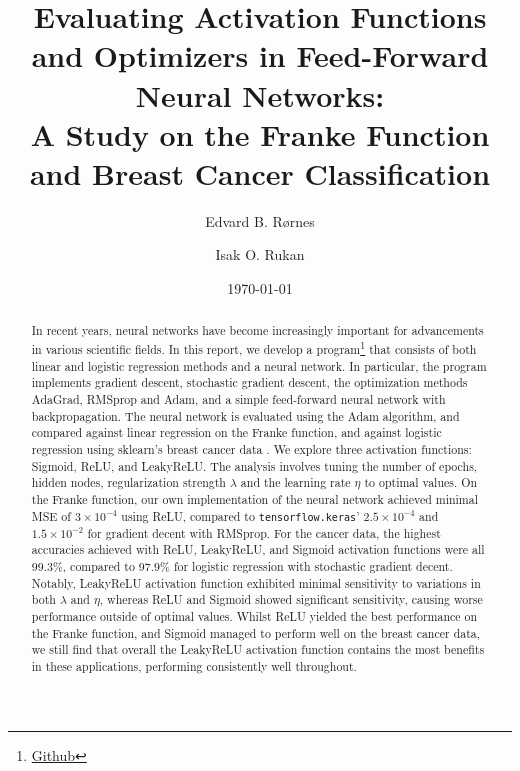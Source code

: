 \documentclass[%
reprint,s
amsmath,amssymb,
aps,
]{revtex4-2}
\begin{document}
	
\title{Evaluating Activation Functions and Optimizers in Feed-Forward Neural Networks: \\A Study on the Franke Function and Breast Cancer Classification}
\author{Edvard B. Rørnes}
\author{Isak O. Rukan}
\date{\today}

\begin{abstract}
	In recent years, neural networks have become increasingly important for advancements in various scientific fields. In this report, we develop a program\footnote{\href{https://github.com/EdvardRornes/FYS-STK4155/tree/main/Project2}{Github}} that consists of both linear and logistic regression methods and a neural network. In particular, the program implements gradient descent, stochastic gradient descent, the optimization methods AdaGrad, RMSprop and Adam, and a simple feed-forward neural network with backpropagation. The neural network is evaluated using the Adam algorithm, and compared against linear regression on the Franke function, and against logistic regression using sklearn's breast cancer data \cite{sklearn}. We explore three activation functions: Sigmoid, ReLU, and LeakyReLU. The analysis involves tuning the number of epochs, hidden nodes, regularization strength $\lambda$ and the learning rate $\eta$ to optimal values. On the Franke function, our own implementation of the neural network achieved minimal MSE of $3\times10^{-4}$ using ReLU, compared to \texttt{tensorflow.keras}' \cite{tensorflow2015-whitepaper} $2.5\times10^{-4}$ and $1.5\times10^{-2}$ for gradient decent with RMSprop. For the cancer data, the highest accuracies achieved with ReLU, LeakyReLU, and Sigmoid activation functions were all $99.3\%$, compared to $97.9\%$ for logistic regression with stochastic gradient decent. Notably, LeakyReLU activation function exhibited minimal sensitivity to variations in both $\lambda$ and $\eta$, whereas ReLU and Sigmoid showed significant sensitivity, causing worse performance outside of optimal values. Whilst ReLU yielded the best performance on the Franke function, and Sigmoid managed to perform well on the breast cancer data, we still find that overall the LeakyReLU activation function contains the most benefits in these applications, performing consistently well throughout.
\end{abstract}

\maketitle
\end{document}
